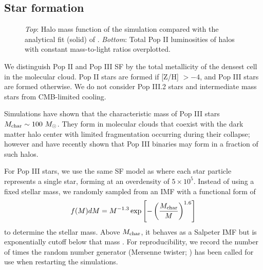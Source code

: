 \documentclass[12pt,preprint]{aastex}
\newcommand{\Ms}{\ifmmode{M_\odot}\else{$M_\odot$}\fi}
\begin{document}

\subsection{Star formation}

\begin{figure}
\caption{\label{fig:massfn} \textit{Top}: Halo mass function of the
  simulation compared with the analytical fit (solid) of
  \citet{Warren06}.  \textit{Bottom}: Total Pop II luminosities of
  halos with constant mass-to-light ratios overplotted.}
\end{figure}

We distinguish Pop II and Pop III SF by the total metallicity of the
densest cell in the molecular cloud.  Pop II stars are formed if [Z/H]
$> -4$, and Pop III stars are formed otherwise.  We do not consider
Pop III.2 stars and intermediate mass stars from CMB-limited cooling.

Simulations have shown that the characteristic mass of Pop III stars
$M_{\rm char} \sim 100~\Ms$.  They form in molecular clouds that
coexist with the dark matter halo center with limited fragmentation
occurring during their collapse; however \citet{2009Sci...325..601T}
and \citet{Stacy10_Binary} have recently shown that Pop III binaries
may form in a fraction of such halos.


For Pop III stars, we use the same SF model as \citet{Wise08_Gal} where
each star particle represents a single star, forming at an overdensity
of $5 \times 10^5$.  Instead of using a fixed stellar mass, we randomly
sampled from an IMF with a functional form of
%
\begin{equation}
\label{eqn:imf}
f(M)dM = M^{-1.3} \exp\left[-\left(\frac{M_{\rm char}}{M}\right)^{1.6}\right]
\end{equation}
to determine the stellar mass.  Above $M_{\rm char}$, it behaves as a
Salpeter IMF but is exponentially cutoff below that mass
\citep{Chabrier03, Clark09}.  For reproducibility, we record the number
of times the random number generator (Mersenne twister;
\citet{MTwister}) has been called for use when restarting the
simulations.
\end{document}
